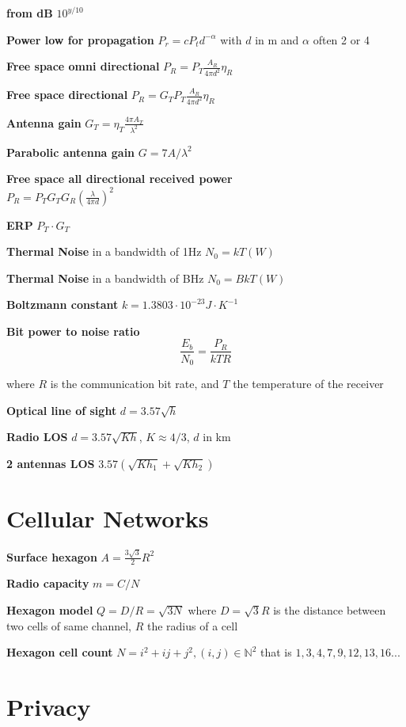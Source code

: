 \documentclass[10pt,twocolumn]{article}
\renewcommand{\l}{\left}
\renewcommand{\r}{\right}
\newcommand{\pfrac}[2]{\l(\frac{#1}{#2}\r)}
\renewcommand{\bf}{\textbf}
\newcommand{\bN}{\mathbb{N}}
\begin{document}
\bf{from dB} $10^{y/10}$

\textbf{Power low for propagation} $P_r = c P_t d^{-\alpha}$ with $d$ in m and $\alpha$ often 2 or 4

\textbf{Free space omni directional} $P_R = P_T \frac{A_R}{4\pi d^2}\eta_R$

\textbf{Free space directional} $P_R = G_T P_T \frac{A_R}{4\pi d^2}\eta_R$

\textbf{Antenna gain} $G_T =\eta_T \frac{4\pi A_T}{\lambda^2}$

\textbf{Parabolic antenna gain} $G=7A/\lambda^2$

\textbf{Free space all directional received power} \\$P_R = P_T G_T G_R \pfrac{\lambda}{4\pi d}^2$


\textbf{ERP} $P_T \cdot G_T$

\bf{Thermal Noise} in a bandwidth of 1Hz $N_0 = kT (W)$ 

\bf{Thermal Noise} in a bandwidth of BHz $N_0 = BkT (W)$ 

\bf{Boltzmann constant} $ k = 1.3803 \cdot 10^{-23} J\cdot K^{-1}$

\bf{Bit power to noise ratio}
\[
  \frac{E_b}{N_0}=\frac{P_R}{kTR}
\]

where $R$ is the communication bit rate, and $T$ the temperature of the receiver

\bf{Optical line of sight} $d = 3.57\sqrt h$

\bf{Radio LOS} $d = 3.57\sqrt {Kh}$, $K \approx 4/3$, $d$ in km

\bf{2 antennas LOS} $3.57(\sqrt{Kh_1} + \sqrt{Kh_2})$

\section{Cellular Networks}


\textbf{Surface hexagon} $A = \frac{3\sqrt 3} 2 R^2$

\bf{Radio capacity} $m = C/N$

\bf{Hexagon model} $Q=D/R = \sqrt{3N}$ where $D=\sqrt{3}R$ is the distance between two cells of same channel, $R$ the radius of a cell

\bf{Hexagon cell count} $N=i^2+ij+j^2, (i,j) \in \bN^2$ that is $1,3,4,7,9,12,13,16...$

\section{Privacy}
\end{document}
